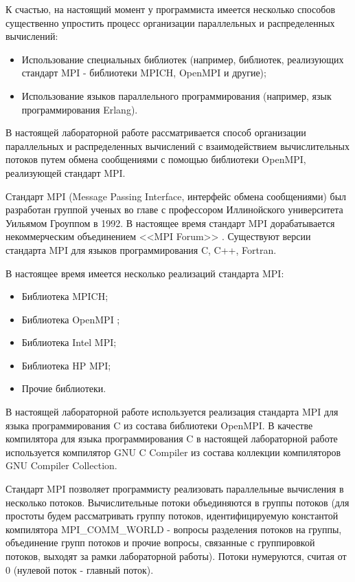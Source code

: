 К счастью, на настоящий момент у программиста имеется несколько способов существенно упростить процесс организации параллельных и распределенных вычислений:

\begin{itemize}

	\item Использование специальных библиотек (например, библиотек, реализующих стандарт MPI - библиотеки MPICH, OpenMPI и другие);
	\item Использование языков параллельного программирования (например, язык программирования Erlang).

\end{itemize}

В настоящей лабораторной работе рассматривается способ организации параллельных и распределенных вычислений с взаимодействием вычислительных потоков путем обмена сообщениями с помощью библиотеки OpenMPI, реализующей стандарт MPI.


Стандарт MPI (Message Passing Interface, интерфейс обмена сообщениями) был разработан группой ученых во главе с профессором Иллинойского университета Уильямом Гроуппом в 1992. В настоящее время стандарт MPI дорабатывается некоммерческим объединением <<MPI Forum>> \cite{mpi-forum}. Существуют версии стандарта MPI для языков программирования C, C++, Fortran.

В настоящее время имеется несколько реализаций стандарта MPI:

\begin{itemize}

	\item Библиотека MPICH;
	\item Библиотека OpenMPI \cite{openmpi};
	\item Библиотека Intel MPI;
	\item Библиотека HP MPI;
	\item Прочие библиотеки.

\end{itemize}

В настоящей лабораторной работе используется реализация стандарта MPI для языка программирования C из состава библиотеки OpenMPI. В качестве компилятора для языка программирования C в настоящей лабораторной работе используется компилятор GNU C Compiler из состава коллекции компиляторов GNU Compiler Collection.

Стандарт MPI позволяет программисту реализовать параллельные вычисления в несколько потоков. Вычислительные потоки объединяются в группы потоков (для простоты будем рассматривать группу потоков, идентифицируемую константой компилятора \linebreak MPI\_COMM\_WORLD - вопросы разделения потоков на группы, объединение групп потоков и прочие вопросы, связанные с группировкой потоков, выходят за рамки лабораторной работы). Потоки нумеруются, считая от 0 (нулевой поток - главный поток).

